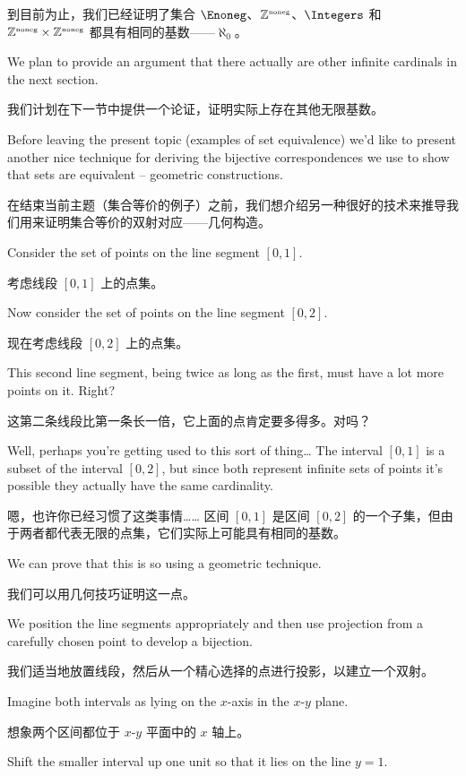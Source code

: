 到目前为止，我们已经证明了集合 $\Enoneg$、${\mathbb Z}^{\mbox{\tiny noneg}}$、$\Integers$ 和 ${\mathbb Z}^{\mbox{\tiny noneg}} \times {\mathbb Z}^{\mbox{\tiny noneg}}$ 都具有相同的基数——$\aleph_0$。

We plan to provide an argument that there
actually are other infinite cardinals in the next section.

我们计划在下一节中提供一个论证，证明实际上存在其他无限基数。

Before leaving the
present topic (examples of set equivalence) we'd like to present another nice
technique for deriving the bijective correspondences we use to show that sets
are equivalent -- geometric constructions.

在结束当前主题（集合等价的例子）之前，我们想介绍另一种很好的技术来推导我们用来证明集合等价的双射对应——几何构造。

Consider the set of points on the line segment $[0, 1]$.

考虑线段 $[0, 1]$ 上的点集。

Now consider the set
of points on the line segment $[0, 2]$.

现在考虑线段 $[0, 2]$ 上的点集。

This second line
segment, being twice as
long as the first, must have a lot more points on it.  Right?

这第二条线段比第一条长一倍，它上面的点肯定要多得多。对吗？

Well, perhaps you're getting used to this sort of thing\ldots
The interval $[0, 1]$ is a subset of the interval $[0, 2]$,
but since both represent infinite sets of points
it's possible they actually have the same cardinality.

嗯，也许你已经习惯了这类事情…… 区间 $[0, 1]$ 是区间 $[0, 2]$ 的一个子集，但由于两者都代表无限的点集，它们实际上可能具有相同的基数。

We can prove that this is so using a geometric technique.

我们可以用几何技巧证明这一点。

We position the line segments appropriately
and then use projection from a carefully chosen point to
develop a bijection.

我们适当地放置线段，然后从一个精心选择的点进行投影，以建立一个双射。

Imagine both intervals as lying on
the $x$-axis in the $x$-$y$ plane.

想象两个区间都位于 $x$-$y$ 平面中的 $x$ 轴上。

Shift the
smaller interval up one unit so that it lies on the line
$y = 1$.

